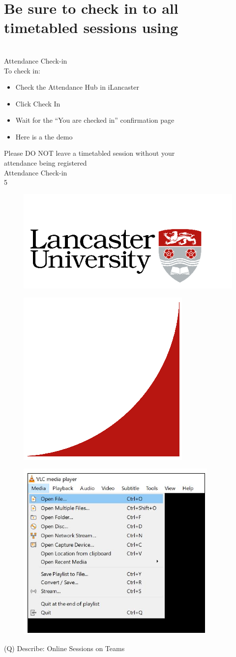 \documentclass[12pt]{article}
\begin{document}
\section{Be sure to check in to all timetabled sessions using }
\\
Attendance Check-in\\
To check in:\\
\begin{itemize}
  \item Check the Attendance Hub in iLancaster
  \item Click Check In
  \item Wait for the “You are checked in” confirmation page
  \item Here is a the demo
\end{itemize}
Please DO NOT leave a timetabled session without your\\
attendance being registered\\
Attendance Check-in\\
5\\
\begin{figure}[H]
\includegraphics[width=0.5\linewidth]{page1-image-1.png}
\end{figure}
\begin{figure}[H]
\includegraphics[width=0.5\linewidth]{page1-image-2.png}
\end{figure}
\begin{figure}[H]
\includegraphics[width=0.5\linewidth]{page1-image-3.png}
\end{figure}
\clearpage
(Q)
Describe: Online Sessions on Teams
\clearpage
\end{document}
